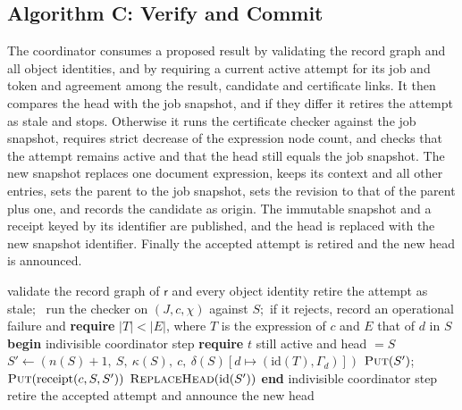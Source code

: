 \documentclass[11pt,a4paper]{article}
\theoremstyle{plain}
\theoremstyle{definition}
\theoremstyle{remark}
\theoremstyle{definition}
\newcommand{\sz}[1]{\lvert #1\rvert}
\newcommand{\hid}{\mathrm{id}}
\begin{document}
\subsection{Algorithm C: Verify and Commit}

The coordinator consumes a proposed result by validating the record graph and all object identities, and by requiring a current active attempt for its job and token and agreement among the result, candidate and certificate links. It then compares the head with the job snapshot, and if they differ it retires the attempt as stale and stops. Otherwise it runs the certificate checker against the job snapshot, requires strict decrease of the expression node count, and checks that the attempt remains active and that the head still equals the job snapshot. The new snapshot replaces one document expression, keeps its context and all other entries, sets the parent to the job snapshot, sets the revision to that of the parent plus one, and records the candidate as origin. The immutable snapshot and a receipt keyed by its identifier are published, and the head is replaced with the new snapshot identifier. Finally the accepted attempt is retired and the new head is announced.

\begin{algorithm}
\caption{Verify and commit.}
\label{alg:commit}
\begin{algorithmic}[1]
  \State validate the record graph of $\mathsf{r}$ and every object identity
   \State \Return \EndIf
   \State retire the attempt as stale;\ \Return \EndIf
  \State run the checker on $(J, c, \chi)$ against $S$;\ if it rejects, record an operational failure and \Return
  \State \textbf{require} $\sz{T} < \sz{E}$, where $T$ is the expression of $c$ and $E$ that of $d$ in $S$
  \State \textbf{begin} indivisible coordinator step
  \State \quad \textbf{require} $t$ still active and head $= S$
  \State \quad $S' \gets (n(S)+1,\ S,\ \kappa(S),\ c,\ \delta(S)[d \mapsto (\hid(T), \Gamma_d)])$
  \State \quad $\textsc{Put}(S')$;\ \ $\textsc{Put}(\mathrm{receipt}(c, S, S'))$
  \State \quad $\textsc{ReplaceHead}(\hid(S'))$
  \State \textbf{end} indivisible coordinator step
  \State retire the accepted attempt and announce the new head
\EndProcedure
\end{algorithmic}
\end{algorithm}
\end{document}

